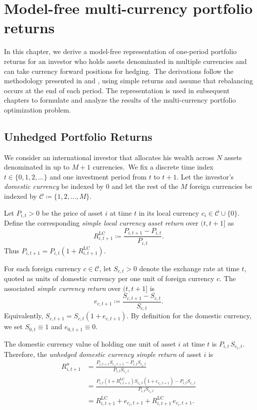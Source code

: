 \chapter{Model-free multi-currency portfolio returns}

In this chapter, we derive a model-free representation of one-period portfolio returns for an investor who holds assets denominated in multiple currencies and can take currency forward positions for hedging.\ The derivations follow the methodology presented in \cite{BurkhardtUlrych2023} and \cite{LucescuUlrych2026}, using simple returns and assume that rebalancing occurs at the end of each period. The representation is used in subsequent chapters to formulate and analyze the results of the multi-currency portfolio optimization problem.

\section{Unhedged Portfolio Returns}

We consider an international investor that allocates his wealth across $N$ assets denominated in up to $M+1$ currencies.\ We fix a discrete time index $t\in\{0,1,2,\dots\}$ and one investment period from $t$ to $t{+}1$. Let the investor's \emph{domestic currency} be indexed by $0$ and let the rest of the $M$ foreign currencies be indexed by $\mathcal{C} \coloneqq \{1,2,\dots,M\}$.

Let $P_{i,t}>0$ be the price of asset $i$ at time $t$ in its local currency $c_i \in \mathcal{C}\cup \{0\}$. Define the corresponding \emph{simple local currency asset return} over $(t,t{+}1]$ as
\begin{equation*}
R^{\text{LC}}_{i,t+1} \coloneqq \frac{P_{i,t+1}-P_{i,t}}{P_{i,t}}.
\end{equation*}
Thus $P_{i,t+1}=P_{i,t}(1+R^{\text{LC}}_{i,t+1})$.

For each foreign currency $c\in\mathcal{C}$, let $S_{c,t} > 0$ denote the exchange rate at time $t$, quoted as units of domestic currency per one unit of foreign currency $c$. The associated \emph{simple currency return} over $(t,t{+}1]$ is
\begin{equation*}
e_{c,t+1} \coloneqq \frac{S_{c,t+1}-S_{c,t}}{S_{c,t}}.
\end{equation*}
Equivalently, $S_{c,t+1} = S_{c,t}(1+e_{c,t+1})$. By definition for the domestic currency, we set $S_{0,t}\equiv 1$ and $e_{0,t+1}\equiv 0$.

The domestic currency value of holding one unit of asset $i$ at time $t$ is $P_{i,t}\,S_{c_i,t}$. Therefore, the \emph{unhedged domestic currency simple return} of asset $i$ is
\begin{align}
R^{u}_{i,t+1}
&=
\frac{P_{i,t+1}S_{c_i,t+1} - P_{i,t}S_{c_i,t}}{P_{i,t}S_{c_i,t}}
\nonumber\\
&=
\frac{P_{i,t}(1+R^{\text{LC}}_{i,t+1}) S_{c_i,t}(1+e_{c_i,t+1}) - P_{i,t}S_{c_i,t}}{P_{i,t}S_{c_i,t}}
\nonumber\\
&=
R^{\text{LC}}_{i,t+1} + e_{c_i,t+1} + R^{\text{LC}}_{i,t+1}\,e_{c_i,t+1}.
\label{eq:unhedged-asset-return}
\end{align}

